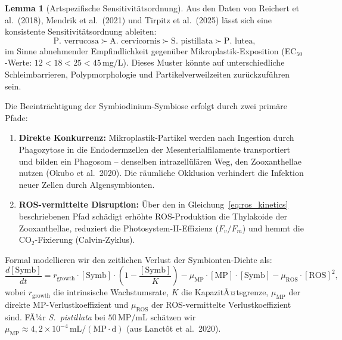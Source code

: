 ﻿\documentclass[12pt,a4paper]{article}
\theoremstyle{definition}
\newtheorem{lemma}{Lemma}[section]
\theoremstyle{remark}
\newcommand{\MP}{Mikroplastik}
\begin{document}
\begin{lemma}[Artspezifische Sensitivit\"atsordnung]
Aus den Daten von Reichert et al.\ (2018), Mendrik et al.\ (2021) und
Tirpitz et al.\ (2025) l\"asst sich eine konsistente Sensitivit\"atsordnung ableiten:
\begin{equation}
  \text{P.~verrucosa} \succ \text{A.~cervicornis} \succ
  \text{S.~pistillata} \succ \text{P.~lutea},
  \label{eq:sensitivity_order}
\end{equation}
im Sinne abnehmender Empfindlichkeit gegen\"uber \MP{}-Exposition (EC$_{50}$-Werte:
$12 < 18 < 25 < 45$\,mg/L). Dieses Muster k\"onnte auf unterschiedliche
Schleimbarrieren, Polypmorphologie und Partikelverweilzeiten zur\"uckzuf\"uhren sein.
\end{lemma}

Die Beeintr\"achtigung der Symbiodinium-Symbiose erfolgt durch zwei prim\"are Pfade:
\begin{enumerate}[leftmargin=*]
  \item \textbf{Direkte Konkurrenz:} Mikroplastik-Partikel werden nach Ingestion
    durch Phagozytose in die Endodermzellen der Mesenterialfilamente transportiert
    und bilden ein Phagosom -- denselben intrazell\"ul\"aren Weg, den Zooxanthellae
    nutzen (Okubo et al.\ 2020). Die r\"aumliche Okklusion verhindert die
    Infektion neuer Zellen durch Algensymbionten.
  \item \textbf{ROS-vermittelte Disruption:} \"Uber den in Gleichung~\eqref{eq:ros_kinetics}
    beschriebenen Pfad sch\"adigt erh\"ohte ROS-Produktion die Thylakoide der
    Zooxanthellae, reduziert die Photosystem-II-Effizienz ($F_v/F_m$) und hemmt
    die CO$_2$-Fixierung (Calvin-Zyklus).
\end{enumerate}

Formal modellieren wir den zeitlichen Verlust der Symbionten-Dichte als:
\begin{equation}
  \frac{d[\text{Symb}]}{dt} = r_{\text{growth}} \cdot [\text{Symb}] \cdot
  \left(1 - \frac{[\text{Symb}]}{K}\right)
  - \mu_{\text{MP}} \cdot [\text{MP}] \cdot [\text{Symb}]
  - \mu_{\text{ROS}} \cdot [\text{ROS}]^2,
  \label{eq:symb_dynamics}
\end{equation}
wobei $r_{\text{growth}}$ die intrinsische Wachstumsrate,
$K$ die KapazitÃ¤tsgrenze, $\mu_{\text{MP}}$ der direkte MP-Verlustkoeffizient
und $\mu_{\text{ROS}}$ der ROS-vermittelte Verlustkoeffizient sind.
FÃ¼r \textit{S.~pistillata} bei $50\,\text{MP/mL}$ sch\"atzen wir
$\mu_{\text{MP}} \approx 4{,}2 \times 10^{-4}\,\text{mL}/(\text{MP}\cdot\text{d})$
(aus Lanct\^{o}t et al.\ 2020).
\end{document}
